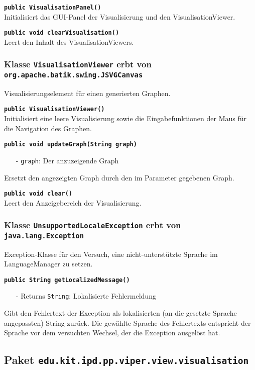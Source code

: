\documentclass[parskip=full,11pt,twoside]{scrartcl}
\begin{document}
\textbf{\texttt{public VisualisationPanel()}}\\
Initialisiert das GUI-Panel der Visualisierung und den VisualisationViewer.

\textbf{\texttt{public void clearVisualisation()}}\\
Leert den Inhalt des VisualisationViewers.

\subsubsection{Klasse \texttt{VisualisationViewer} erbt von \texttt{org.apache.batik.swing.JSVGCanvas}}

Visualisierungselement für einen generierten Graphen.

\textbf{\texttt{public VisualisationViewer()}}\\
Initialisiert eine leere Visualisierung sowie die Eingabefunktionen der Maus für die Navigation des Graphen.

\textbf{\texttt{public void updateGraph(String graph)}}
\begin{itemize}[noitemsep]
	\item[-] \texttt{graph}: Der anzuzeigende Graph
\end{itemize}
Ersetzt den angezeigten Graph durch den im Parameter gegebenen Graph.

\textbf{\texttt{public void clear()}}\\
Leert den Anzeigebereich der Visualisierung.

\subsubsection{Klasse \texttt{UnsupportedLocaleException} erbt von \texttt{java.lang.Exception}}
Exception-Klasse für den Versuch, eine nicht-unterstützte Sprache im LanguageManager zu setzen.

\textbf{\texttt{public String getLocalizedMessage()}}
\begin{itemize}[noitemsep]
	\item[-] Returns \texttt{String}: Lokalisierte Fehlermeldung
\end{itemize}
Gibt den Fehlertext der Exception als lokalisierten (an die gesetzte Sprache angepassten) String zurück. Die gewählte Sprache des Fehlertexts entspricht der Sprache vor dem versuchten Wechsel, der die Exception ausgelöst hat.

\subsection{Paket \texttt{edu.kit.ipd.pp.viper.view.visualisation}}
\end{document}
